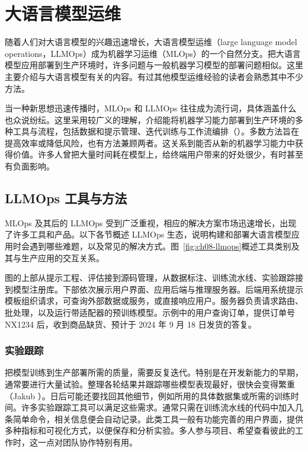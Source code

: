 \section{大语言模型运维}
\label{sec:ch08-llmops}
随着人们对大语言模型的兴趣迅速增长，大语言模型运维（large language model operations，LLMOps）成为机器学习运维（MLOps）的一个自然分支。把大语言模型应用部署到生产环境时，许多问题与一般机器学习模型的部署问题相似。这里主要介绍与大语言模型有关的内容。有过其他模型运维经验的读者会熟悉其中不少方法。

当一种新思想迅速传播时，MLOps 和 LLMOps 往往成为流行词，具体涵盖什么也众说纷纭。这里采用较广义的理解，介绍能将机器学习能力部署到生产环境的多种工具与流程，包括数据和提示管理、迭代训练与工作流编排（）。多数方法旨在提高效率或降低风险，也有方法兼顾两者。这关系到能否从新的机器学习能力中获得价值。许多人曾把大量时间耗在模型上，给终端用户带来的好处很少，有时甚至有负面影响。

\subsection{LLMOps 工具与方法}
MLOps 及其后的 LLMOps 受到广泛重视，相应的解决方案市场迅速增长，出现了许多工具和产品。以下各节概述 LLMOps 生态，说明构建和部署大语言模型应用时会遇到哪些难题，以及常见的解决方式。图~\ref{fig:ch08-llmops}概述工具类别及其与生产应用的交互关系。


图的上部从提示工程、评估接到源码管理，从数据标注、训练流水线、实验跟踪接到模型注册库。下部依次展示用户界面、应用后端与推理服务器。后端用系统提示模板组织请求，可查询外部数据或服务，或直接响应用户。服务器负责请求路由、批处理，以及运行带适配器的预训练模型。示例中的用户查询订单，提供订单号 NX1234 后，收到商品缺货、预计于 2024 年 9 月 18 日发货的答复。

\subsubsection{实验跟踪}
把模型训练到生产部署所需的质量，需要反复迭代。特别是在开发新能力的早期，通常要进行大量试验。整理各轮结果并跟踪哪些模型表现最好，很快会变得繁重（Jakub ）。日后可能还要找回其他细节，例如所用的具体数据集或所需的训练时间。许多实验跟踪工具可以满足这些需求。通常只需在训练流水线的代码中加入几条简单命令，相关信息便会自动记录。此类工具一般有功能完善的用户界面，提供多种指标和可视化方式，以便保存和分析实验。多人参与项目、希望查看彼此的工作时，这一点对团队协作特别有用。

